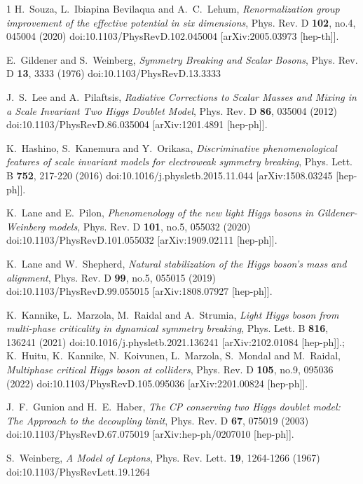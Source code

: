 \documentclass[11pt,a4paper,english,superscriptaddress,preprint,aps,prd]{revtex4}
\begin{document}
\begin{thebibliography}{1}
H.~Souza, L.~Ibiapina Bevilaqua and A.~C.~Lehum,
\textit{Renormalization group improvement of the effective potential in six dimensions},
Phys. Rev. D \textbf{102}, no.4, 045004 (2020)
doi:10.1103/PhysRevD.102.045004
[arXiv:2005.03973 [hep-th]].

E.~Gildener and S.~Weinberg,
\textit{Symmetry Breaking and Scalar Bosons},
Phys. Rev. D \textbf{13}, 3333 (1976)
doi:10.1103/PhysRevD.13.3333

J.~S.~Lee and A.~Pilaftsis,
\textit{Radiative Corrections to Scalar Masses and Mixing in a Scale Invariant Two Higgs Doublet Model},
Phys. Rev. D \textbf{86}, 035004 (2012)
doi:10.1103/PhysRevD.86.035004
[arXiv:1201.4891 [hep-ph]].

K.~Hashino, S.~Kanemura and Y.~Orikasa,
\textit{Discriminative phenomenological features of scale invariant models for electroweak symmetry breaking},
Phys. Lett. B \textbf{752}, 217-220 (2016)
doi:10.1016/j.physletb.2015.11.044
[arXiv:1508.03245 [hep-ph]].

K.~Lane and E.~Pilon,
\textit{Phenomenology of the new light Higgs bosons in Gildener-Weinberg models},
Phys. Rev. D \textbf{101}, no.5, 055032 (2020)
doi:10.1103/PhysRevD.101.055032
[arXiv:1909.02111 [hep-ph]].

K.~Lane and W.~Shepherd,
\textit{Natural stabilization of the Higgs boson’s mass and alignment},
Phys. Rev. D \textbf{99}, no.5, 055015 (2019)
doi:10.1103/PhysRevD.99.055015
[arXiv:1808.07927 [hep-ph]].

K.~Kannike, L.~Marzola, M.~Raidal and A.~Strumia,
\textit{Light Higgs boson from multi-phase criticality in dynamical symmetry breaking},
Phys. Lett. B \textbf{816}, 136241 (2021)
doi:10.1016/j.physletb.2021.136241
[arXiv:2102.01084 [hep-ph]].; K.~Huitu, K.~Kannike, N.~Koivunen, L.~Marzola, S.~Mondal and M.~Raidal,
\textit{Multiphase critical Higgs boson at colliders},
Phys. Rev. D \textbf{105}, no.9, 095036 (2022)
doi:10.1103/PhysRevD.105.095036
[arXiv:2201.00824 [hep-ph]].

J.~F.~Gunion and H.~E.~Haber,
\textit{The CP conserving two Higgs doublet model: The Approach to the decoupling limit},
Phys. Rev. D \textbf{67}, 075019 (2003)
doi:10.1103/PhysRevD.67.075019
[arXiv:hep-ph/0207010 [hep-ph]].

S.~Weinberg,
\textit{A Model of Leptons},
Phys. Rev. Lett. \textbf{19}, 1264-1266 (1967)
doi:10.1103/PhysRevLett.19.1264


\end{thebibliography}
\end{document}
